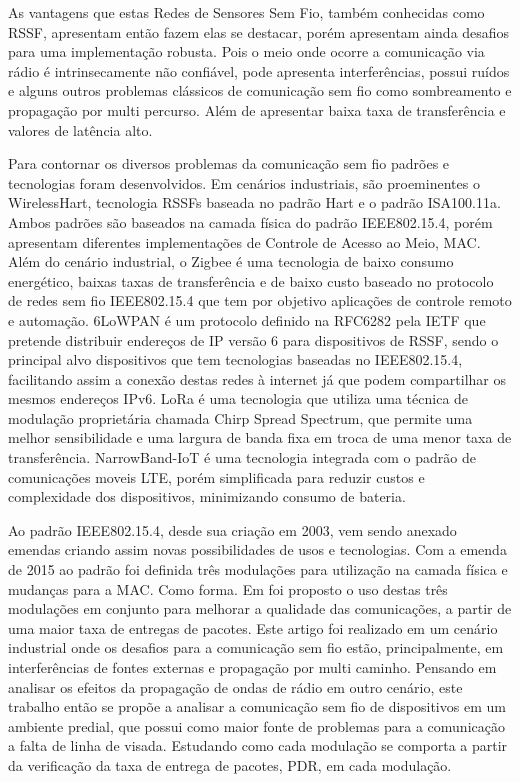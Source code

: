 As vantagens que estas Redes de Sensores Sem Fio, também conhecidas como RSSF, apresentam então fazem elas se destacar, porém apresentam ainda desafios para uma implementação robusta. Pois o meio onde ocorre a comunicação via rádio é intrinsecamente não confiável, pode apresenta interferências, possui ruídos e alguns outros problemas clássicos de comunicação sem fio como sombreamento e propagação por multi percurso. Além de apresentar baixa taxa de transferência e valores de latência alto\cite{gomes2017estimaccao}.

Para contornar os diversos problemas da comunicação sem fio padrões e tecnologias foram desenvolvidos. Em cenários industriais, são proeminentes o WirelessHart, tecnologia RSSFs baseada no padrão Hart\cite{WIHART} e o padrão ISA100.11a. Ambos padrões são baseados na camada física do padrão IEEE802.15.4, porém apresentam diferentes implementações de Controle de Acesso ao Meio\cite{gomes2017estimaccao}, MAC. Além do cenário industrial, o Zigbee é uma tecnologia de baixo consumo energético, baixas taxas de transferência e de baixo custo baseado no protocolo de redes sem fio IEEE802.15.4 que tem por objetivo aplicações de controle remoto e automação\cite{ergen2004zigbee}. 6LoWPAN é um protocolo definido na RFC6282 pela IETF que pretende distribuir endereços de IP versão 6 para dispositivos de RSSF, sendo o principal alvo dispositivos que tem tecnologias baseadas no IEEE802.15.4, facilitando assim a conexão destas redes à internet já que podem compartilhar os mesmos endereços IPv6\cite{olsson20146lowpan}. LoRa é uma tecnologia que utiliza uma técnica de modulação proprietária chamada Chirp Spread Spectrum, que permite uma melhor sensibilidade e uma largura de banda fixa em troca de uma menor taxa de transferência\cite{sinha2017survey}. NarrowBand-IoT é uma tecnologia integrada com o padrão de comunicações moveis LTE, porém simplificada para reduzir custos e complexidade dos dispositivos, minimizando consumo de bateria\cite{sinha2017survey}.

Ao padrão IEEE802.15.4, desde sua criação em 2003, vem sendo anexado emendas criando assim novas possibilidades de usos e tecnologias. Com a emenda de 2015 ao padrão foi definida três modulações para utilização na camada física e mudanças para a MAC\cite{chang2012ieee}. Como forma. Em \cite{tuset2020reliability} foi proposto o uso destas três modulações em conjunto para melhorar a qualidade das comunicações, a partir de uma maior taxa de entregas de pacotes. Este artigo foi realizado em um cenário industrial onde os desafios para a comunicação sem fio estão, principalmente, em interferências de fontes externas e propagação por multi caminho. Pensando em analisar os efeitos da propagação de ondas de rádio em outro cenário, este trabalho então se propõe a analisar a comunicação sem fio de dispositivos em um ambiente predial, que possui como maior fonte de problemas para a comunicação a falta de linha de visada. Estudando como cada modulação se comporta a partir da verificação da taxa de entrega de pacotes, PDR, em cada modulação.

